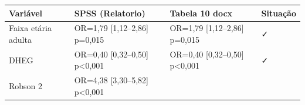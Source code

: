 \documentclass[
]{article}
\begin{document}
\begin{longtable}[]{@{}llll@{}}
\toprule
\begin{minipage}[b]{0.22\columnwidth}\raggedright
Variável\strut
\end{minipage} & \begin{minipage}[b]{0.22\columnwidth}\raggedright
SPSS (Relatorio)\strut
\end{minipage} & \begin{minipage}[b]{0.22\columnwidth}\raggedright
Tabela 10 docx\strut
\end{minipage} & \begin{minipage}[b]{0.22\columnwidth}\raggedright
Situação\strut
\end{minipage}\tabularnewline
\midrule
\endhead
\begin{minipage}[t]{0.22\columnwidth}\raggedright
Faixa etária adulta\strut
\end{minipage} & \begin{minipage}[t]{0.22\columnwidth}\raggedright
OR=1,79 {[}1,12--2,86{]} p=0,015\strut
\end{minipage} & \begin{minipage}[t]{0.22\columnwidth}\raggedright
OR=1,79 {[}1,12--2,86{]} p=0,015\strut
\end{minipage} & \begin{minipage}[t]{0.22\columnwidth}\raggedright
✓\strut
\end{minipage}\tabularnewline
\begin{minipage}[t]{0.22\columnwidth}\raggedright
DHEG\strut
\end{minipage} & \begin{minipage}[t]{0.22\columnwidth}\raggedright
OR=0,40 {[}0,32--0,50{]} p\textless0,001\strut
\end{minipage} & \begin{minipage}[t]{0.22\columnwidth}\raggedright
OR=0,40 {[}0,32--0,50{]} p\textless0,001\strut
\end{minipage} & \begin{minipage}[t]{0.22\columnwidth}\raggedright
✓\strut
\end{minipage}\tabularnewline
\begin{minipage}[t]{0.22\columnwidth}\raggedright
Robson 2\strut
\end{minipage} & \begin{minipage}[t]{0.22\columnwidth}\raggedright
OR=4,38 {[}3,30--5,82{]} p\textless0,001\strut
\end{minipage} & \begin{minipage}[t]{0.22\columnwidth}\raggedright

\end{minipage}
\end{longtable}
\end{document}
